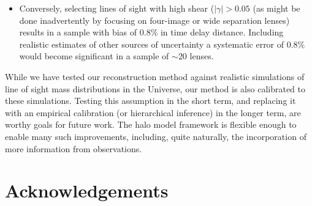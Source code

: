 \documentclass[useAMS,usenatbib,a4paper]{mn2e}
\begin{document}
\begin{itemize}
\item Conversely, selecting lines of sight with high shear ($|\gamma| >
0.05$ (as might be done inadvertently by focusing on four-image or wide
separation lenses) results in a sample with bias of 0.8\% in time delay
distance. Including realistic estimates of other sources of uncertainty a systematic error
of 0.8\% would become significant in a sample of $\sim$20 lenses. 


\end{itemize}





While we have tested our reconstruction method against realistic simulations
of line of sight mass distributions in the Universe, our method is also 
calibrated to these simulations. Testing this assumption in the short term,
and replacing it with an empirical calibration (or hierarchical inference) in
the longer term, are worthy goals for future work. The halo model framework is
flexible enough to enable many such improvements, including, quite naturally,
the incorporation of more information from observations. 



\section*{Acknowledgements}
 
\end{document}
